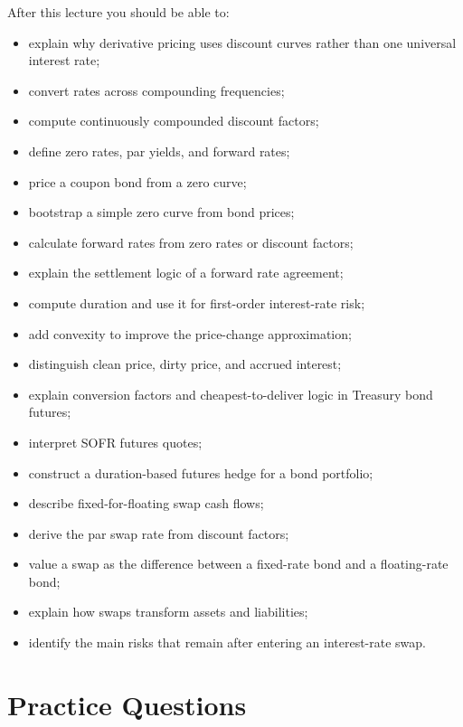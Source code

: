 After this lecture you should be able to:
\begin{itemize}
    \item explain why derivative pricing uses discount curves rather than one
    universal interest rate;
    \item convert rates across compounding frequencies;
    \item compute continuously compounded discount factors;
    \item define zero rates, par yields, and forward rates;
    \item price a coupon bond from a zero curve;
    \item bootstrap a simple zero curve from bond prices;
    \item calculate forward rates from zero rates or discount factors;
    \item explain the settlement logic of a forward rate agreement;
    \item compute duration and use it for first-order interest-rate risk;
    \item add convexity to improve the price-change approximation;
    \item distinguish clean price, dirty price, and accrued interest;
    \item explain conversion factors and cheapest-to-deliver logic in Treasury
    bond futures;
    \item interpret SOFR futures quotes;
    \item construct a duration-based futures hedge for a bond portfolio;
    \item describe fixed-for-floating swap cash flows;
    \item derive the par swap rate from discount factors;
    \item value a swap as the difference between a fixed-rate bond and a
    floating-rate bond;
    \item explain how swaps transform assets and liabilities;
    \item identify the main risks that remain after entering an interest-rate
    swap.
\end{itemize}

\section{Practice Questions}

